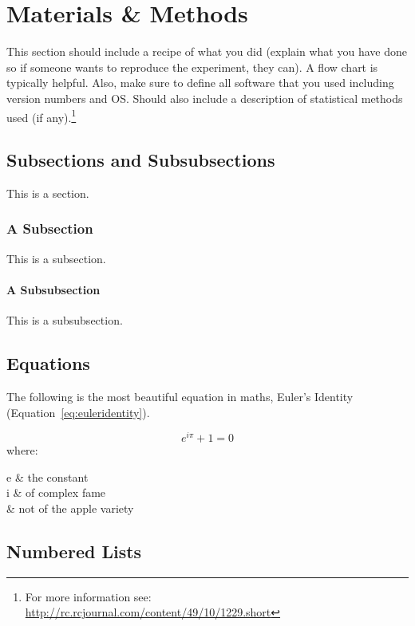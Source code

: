 \chapter{Materials \& Methods}

This section should include a recipe of what you did (explain what you have done so if someone wants to reproduce the experiment, they can).  A flow chart is typically helpful.  Also, make sure to define all software that you used including version numbers and OS.  Should also include a description of statistical methods used (if any).\footnote{For more information see: \url{http://rc.rcjournal.com/content/49/10/1229.short}}

\blindtext

\section{Subsections and Subsubsections}

This is a section.

\subsection{A Subsection}

This is a subsection.

\subsubsection{A Subsubsection}

This is a subsubsection.

\section{Equations}

The following is the most beautiful equation in maths, Euler's Identity (Equation~\ref{eq:euleridentity}).

\begin{equation}\label{eq:euleridentity}
	e^{i\pi}+1=0
\end{equation}
where:
\begin{conditionsenv*}
	e 		& the constant \\
	i 		& of complex fame \\
	\pi		& not of the apple variety \\
\end{conditionsenv*}

\blindtext[2]

\section{Numbered Lists}

